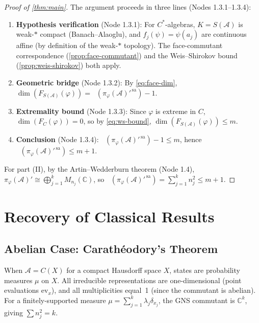 \documentclass[11pt,a4paper]{article}
\theoremstyle{plain}
\theoremstyle{definition}
\theoremstyle{remark}
\newcommand{\R}{\mathbb{R}}
\newcommand{\C}{\mathbb{C}}
\newcommand{\sa}{\mathrm{sa}}
\DeclareMathOperator{\dimR}{dim_{\R}}
\begin{document}
\begin{proof}[Proof of \cref{thm:main}]
The argument proceeds in three lines (Nodes 1.3.1--1.3.4):
\begin{enumerate}
  \item \textbf{Hypothesis verification} (Node 1.3.1):
        For $C^*$-algebras, $K = S(\mathcal{A})$ is weak-$*$ compact
        (Banach--Alaoglu), and $f_j(\psi) = \psi(a_j)$ are continuous
        affine (by definition of the weak-$*$ topology).
        The face-commutant correspondence (\cref{prop:face-commutant})
        and the Weis--Shirokov bound (\cref{prop:weis-shirokov}) both apply.
  \item \textbf{Geometric bridge} (Node 1.3.2):
        By \eqref{eq:face-dim},
        $\dim(F_{S(\mathcal{A})}(\varphi))
        = \dimR(\pi_\varphi(\mathcal{A})'^{\,\sa}) - 1$.
  \item \textbf{Extremality bound} (Node 1.3.3):
        Since $\varphi$ is extreme in $C$,
        $\dim(F_C(\varphi)) = 0$, so by \eqref{eq:ws-bound},
        $\dim(F_{S(\mathcal{A})}(\varphi)) \le m$.
  \item \textbf{Conclusion} (Node 1.3.4):
        $\dimR(\pi_\varphi(\mathcal{A})'^{\,\sa}) - 1 \le m$,
        hence $\dimR(\pi_\varphi(\mathcal{A})'^{\,\sa}) \le m + 1$.
\end{enumerate}
For part (II), by the Artin--Wedderburn theorem (Node 1.4),
$\pi_\varphi(\mathcal{A})' \cong \bigoplus_{j=1}^k M_{n_j}(\C)$,
so $\dimR(\pi_\varphi(\mathcal{A})'^{\,\sa})
= \sum_{j=1}^k n_j^2 \le m + 1$.
\end{proof}


\section{Recovery of Classical Results}
\label{sec:recovery}

\subsection{Abelian Case: Carath\'eodory's Theorem}
\label{sec:caratheodory}

When $\mathcal{A} = C(X)$ for a compact Hausdorff space $X$, states
are probability measures $\mu$ on $X$. All irreducible representations
are one-dimensional (point evaluations $\mathrm{ev}_x$), and all
multiplicities equal~1 (since the commutant is abelian).
For a finitely-supported measure $\mu = \sum_{j=1}^k \lambda_j \delta_{x_j}$,
the GNS commutant is $\C^k$, giving $\sum n_j^2 = k$.
\end{document}
